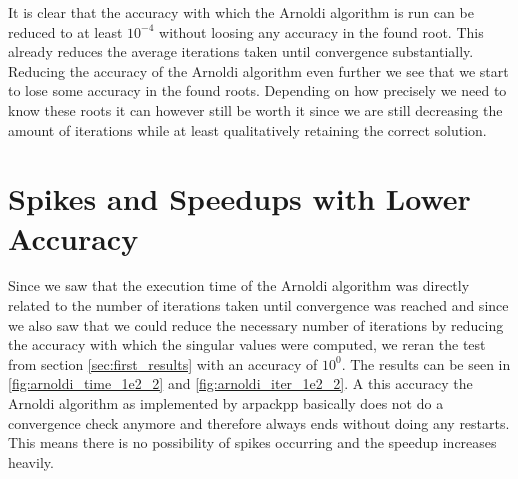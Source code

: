 \documentclass[a4paper, oneside]{thirdparty_stylesheets/discothesis}
\begin{document}
It is clear that the accuracy with which the Arnoldi algorithm is run can be reduced to at least $10^{-4}$ without loosing any accuracy in the found root.
This already reduces the average iterations taken until convergence substantially.
Reducing the accuracy of the Arnoldi algorithm even further we see that we start to lose some accuracy in the found roots.
Depending on how precisely we need to know these roots it can however still be worth it since we are still decreasing the amount of iterations while at least qualitatively retaining the correct solution.

\section{Spikes and Speedups with Lower Accuracy}
Since we saw that the execution time of the Arnoldi algorithm was directly related to the number of iterations taken until convergence was reached and since we also saw that we could reduce the necessary number of iterations by reducing the accuracy with which the singular values were computed, we reran the test from section \ref{sec:first_results} with an accuracy of $10^0$.
The results can be seen in \ref{fig:arnoldi_time_1e2_2} and \ref{fig:arnoldi_iter_1e2_2}.
A this accuracy the Arnoldi algorithm as implemented by arpackpp basically does not do a convergence check anymore and therefore always ends without doing any restarts.
This means there is no possibility of spikes occurring and the speedup increases heavily.
\end{document}

